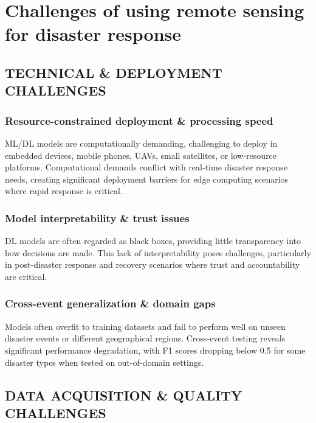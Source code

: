 \documentclass[conference,a4paper]{IEEEtran}
\begin{document}

\section{Challenges of using remote sensing for disaster response}


\subsection{TECHNICAL \& DEPLOYMENT CHALLENGES}
\subsubsection{Resource-constrained deployment \& processing speed}
ML/DL models are computationally demanding, challenging to deploy in embedded devices, mobile phones, UAVs, small satellites, or low-resource platforms. Computational demands conflict with real-time disaster response needs, creating significant deployment barriers for edge computing scenarios where rapid response is critical.

\subsubsection{Model interpretability \& trust issues}
DL models are often regarded as black boxes, providing little transparency into how decisions are made. This lack of interpretability poses challenges, particularly in post-disaster response and recovery scenarios where trust and accountability are critical.
\subsubsection{Cross-event generalization \& domain gaps}
Models often overfit to training datasets and fail to perform well on unseen disaster events or different geographical regions. Cross-event testing reveals significant performance degradation, with F1 scores dropping below 0.5 for some disaster types when tested on out-of-domain settings.
\subsection{DATA ACQUISITION \& QUALITY CHALLENGES}
\end{document}
